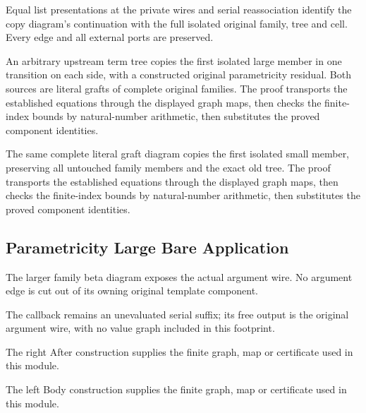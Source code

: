Equal list presentations at the private wires and serial reassociation
identify the copy diagram's continuation with the full isolated original
family, tree and cell. Every edge and all external ports are preserved.
\par{}

An arbitrary upstream term tree copies the first isolated large member
in one transition on each side, with a constructed original parametricity
residual. Both sources are literal grafts of complete original families.
The proof transports the established equations through the displayed graph maps, then checks the finite-index bounds by natural-number arithmetic, then substitutes the proved component identities.
\par{}

The same complete literal graft diagram copies the first isolated small
member, preserving all untouched family members and the exact old tree.
The proof transports the established equations through the displayed graph maps, then checks the finite-index bounds by natural-number arithmetic, then substitutes the proved component identities.
\par{}

\subsection{Parametricity Large Bare Application}
The larger family beta diagram exposes the actual argument wire.
No argument edge is cut out of its owning original template component.

The callback remains an unevaluated serial suffix; its free output is
the original argument wire, with no value graph included in this footprint.
\par{}

The right After construction supplies the finite graph, map or certificate used in this module.
\par{}

The left Body construction supplies the finite graph, map or certificate used in this module.
\par{}


